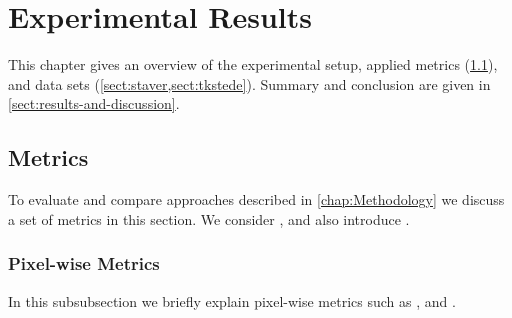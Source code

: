 \section{Experimental Results}
This chapter gives an overview of the experimental setup, applied metrics
(\cref{sect:metrics}), and data sets (\cref{sect:staver,sect:tkstede}). Summary
and conclusion are given in \cref{sect:results-and-discussion}.

\subsection{Metrics}\label{sect:metrics}
To evaluate and compare approaches described in \cref{chap:Methodology} we
discuss a set of metrics in this section. We consider
,  and also
introduce .

\subsubsection{Pixel-wise Metrics}\label{subsect:pixel-wise-metrics}
In this subsubsection we briefly explain pixel-wise metrics such as
,  and .

